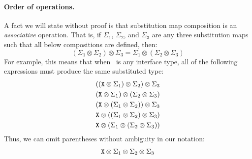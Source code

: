 \documentclass[../generics]{subfiles}
\begin{document}
\paragraph{Order of operations.}
A fact we will state without proof is that substitution map composition is an \emph{associative} operation. That is, if $\Sigma_1$, $\Sigma_2$, and $\Sigma_3$ are any three substitution maps such that all below compositions are defined, then:
\[
(\Sigma_1 \otimes \Sigma_2) \otimes \Sigma_3 = \Sigma_1 \otimes (\Sigma_2 \otimes \Sigma_3)
\]
For example, this means that when \tX\ is any interface type, all of the following expressions must produce the same substituted type:
\begin{gather*}
((\texttt{X}\otimes\Sigma_1)\otimes\Sigma_2)\otimes\Sigma_3\\
(\texttt{X}\otimes\Sigma_1)\otimes(\Sigma_2\otimes\Sigma_3)\\
(\texttt{X}\otimes(\Sigma_1\otimes\Sigma_2))\otimes\Sigma_3\\
\texttt{X}\otimes((\Sigma_1\otimes\Sigma_2)\otimes\Sigma_3)\\
\texttt{X}\otimes(\Sigma_1\otimes(\Sigma_2\otimes\Sigma_3))
\end{gather*}
Thus, we can omit parentheses without ambiguity in our notation:
\[\texttt{X}\otimes\Sigma_1\otimes\Sigma_2\otimes\Sigma_3\]
\end{document}
